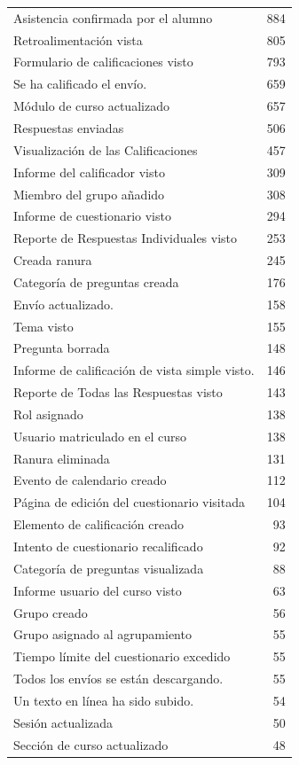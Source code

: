 \documentclass[notspecified,article,submit,moreauthors,pdftex]{Definitions/mdpi}
\begin{document}
\begin{longtable}[]{@{}lr@{}}
Asistencia confirmada por el alumno & 884 \\
Retroalimentación vista & 805 \\
Formulario de calificaciones visto & 793 \\
Se ha calificado el envío. & 659 \\
Módulo de curso actualizado & 657 \\
Respuestas enviadas & 506 \\
Visualización de las Calificaciones & 457 \\
Informe del calificador visto & 309 \\
Miembro del grupo añadido & 308 \\
Informe de cuestionario visto & 294 \\
Reporte de Respuestas Individuales visto & 253 \\
Creada ranura & 245 \\
Categoría de preguntas creada & 176 \\
Envío actualizado. & 158 \\
Tema visto & 155 \\
Pregunta borrada & 148 \\
Informe de calificación de vista simple visto. & 146 \\
Reporte de Todas las Respuestas visto & 143 \\
Rol asignado & 138 \\
Usuario matriculado en el curso & 138 \\
Ranura eliminada & 131 \\
Evento de calendario creado & 112 \\
Página de edición del cuestionario visitada & 104 \\
Elemento de calificación creado & 93 \\
Intento de cuestionario recalificado & 92 \\
Categoría de preguntas visualizada & 88 \\
Informe usuario del curso visto & 63 \\
Grupo creado & 56 \\
Grupo asignado al agrupamiento & 55 \\
Tiempo límite del cuestionario excedido & 55 \\
Todos los envíos se están descargando. & 55 \\
Un texto en línea ha sido subido. & 54 \\
Sesión actualizada & 50 \\
Sección de curso actualizado & 48 \\

\end{longtable}
\end{document}
